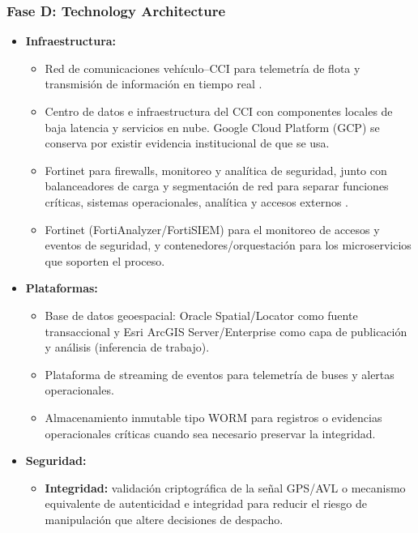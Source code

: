 \begin{singlespace}
\subsubsection*{Fase D: Technology Architecture}

\begin{itemize}
	\item \textbf{Infraestructura:}
	\begin{itemize}
		\item[$\Rightarrow$] Red de comunicaciones vehículo--CCI para telemetría de flota y transmisión de información en tiempo real \parencite{transmilenio2026cci}.
		\item[$\Rightarrow$] Centro de datos e infraestructura del CCI con componentes locales de baja latencia y servicios en nube. Google Cloud Platform (GCP) se conserva por existir evidencia institucional de que se usa.
		\item[$\Rightarrow$] Fortinet para firewalls, monitoreo y analítica de seguridad, junto con balanceadores de carga y segmentación de red para separar funciones críticas, sistemas operacionales, analítica y accesos externos \parencite{transmilenio2025res439}.
		\item[$\Rightarrow$] Fortinet (FortiAnalyzer/FortiSIEM) para el monitoreo de accesos y eventos de seguridad, y contenedores/orquestación para los microservicios que soporten el proceso.
	\end{itemize}
	\item \textbf{Plataformas:}
	\begin{itemize}
		\item[$\Rightarrow$] Base de datos geoespacial: Oracle Spatial/Locator como fuente transaccional y Esri ArcGIS Server/Enterprise como capa de publicación y análisis (inferencia de trabajo).
		\item[$\Rightarrow$] Plataforma de streaming de eventos para telemetría de buses y alertas operacionales.
		\item[$\Rightarrow$] Almacenamiento inmutable tipo WORM para registros o evidencias operacionales críticas cuando sea necesario preservar la integridad.
	\end{itemize}
	\item \textbf{Seguridad:}
	\begin{itemize}
		\item[$\Rightarrow$] \textbf{Integridad:} validación criptográfica de la señal GPS/AVL o mecanismo equivalente de autenticidad e integridad para reducir el riesgo de manipulación que altere decisiones de despacho.

\end{itemize}
\end{itemize}
\end{singlespace}
